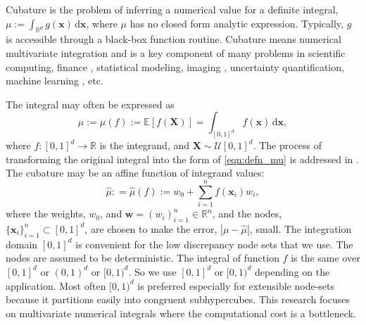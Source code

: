 \documentclass{iitthesis}          %
\newcommand{\bm}[1]{\boldsymbol{#1}}
\newcommand{\dif}[1]{\text{d}{#1}}
\newcommand{\reals}{\mathbb{R}}
\newcommand{\Ex}{\mathbb{E}}
\newcommand{\vw}{\bm{w}}
\newcommand{\vx}{\bm{x}}
\newcommand{\dvx}{\dif{\bm{x}}}
\newcommand{\hmu}{\widehat{\mu}}
\def\abs#1{\ensuremath{\left \lvert #1 \right \rvert}}
\newcommand{\JRNote}[1]{}
\begin{document}
\textpages     %




\label{intro}

Cubature is the problem of inferring a numerical value for a definite integral, 
$ \mu := \int_{\reals^d} g(\vx) \, \dif \vx$, where $\mu$ has no closed form analytic expression. Typically, $g$ is accessible through a black-box function routine. 
Cubature means numerical multivariate integration and is a key component of many problems in scientific computing, finance \cite{Gla03}, statistical modeling, imaging \cite{Keller2013}, uncertainty quantification, machine learning \cite{Goodfellow-et-al-2016}, etc.

The integral may often be expressed as
\begin{equation}
\label{eqn:defn_mu}
\mu:= \mu(f) := \Ex[f(\boldsymbol{X})] = \int_{[0,1]^d} f(\vx)\, \dvx, 
\end{equation}
where $f:[0,1]^d \to \reals$ is the integrand, and $\boldsymbol{X} \sim \mathcal{U}[0,1]^d$.  The process of transforming the original integral into the form of \eqref{eqn:defn_mu} is addressed in \cite{BecHae92b, Sid08a, Sid93, Lau96a, CriEtal07}.  The cubature may be an affine function of integrand values:
\begin{equation}
\label{eqn:defn_hmu}  %
\hmu: = \hmu(f) := w_0 + \sum_{i=1}^{n} f(\vx_i) w_i,
\end{equation}
where the weights, $w_0$, and  $\vw = (w_i)_{i=1}^n \in \reals^n$, and the nodes, $\{\vx_i\}_{i=1}^n \subset [0,1]^d$, are chosen to make the error, $\abs{\mu - \hmu}$, small. The integration domain $[0,1]^d$ is convenient for the low discrepancy node sets that we use.  The nodes are assumed to be deterministic.
The integral of function $f$ is the same over $[0, 1]^d$ or $(0, 1)^d$ or $[0, 1)^d$. So we use $[0, 1]^d$ or $[0, 1)^d$ depending on the application. Most often $[0, 1)^d$ is preferred especially for extensible node-sets because  it partitions easily into congruent subhypercubes.
This research focuses on multivariate numerical integrals where the computational cost is a bottleneck. %

\pagebreak


\end{document}
